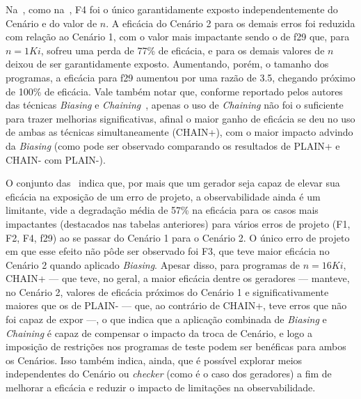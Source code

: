 Na~, como na~, F4 foi o único
garantidamente exposto independentemente do Cenário e do valor de $n$. A
eficácia do Cenário 2 para os demais erros foi reduzida com relação ao Cenário
1, com o valor mais impactante sendo o de f29 que, para $n = 1Ki$, sofreu uma
perda de 77\% de eficácia, e para os demais valores de $n$ deixou de ser
garantidamente exposto. Aumentando, porém, o tamanho dos programas, a eficácia
para f29 aumentou por uma razão de 3.5, chegando próximo de 100\% de eficácia.
Vale também notar que, conforme reportado pelos autores das técnicas
\textit{Biasing} e \textit{Chaining}~\cite{Andrade:2019}, apenas o uso de
\textit{Chaining} não foi o suficiente para trazer melhorias significativas,
afinal o maior ganho de eficácia se deu no uso de ambas as técnicas
simultaneamente (CHAIN+), com o maior impacto advindo da \textit{Biasing} (como
pode ser observado comparando os resultados de PLAIN+ e CHAIN- com PLAIN-).

O conjunto
das~
indica que, por mais que um gerador seja capaz de elevar sua eficácia na
exposição de um erro de projeto, a observabilidade ainda é um limitante, vide a
degradação média de 57\% na eficácia para os casos mais impactantes (destacados
nas tabelas anteriores) para vários erros de projeto (F1, F2, F4, f29) ao se
passar do Cenário 1 para o Cenário 2.  O único erro de projeto em que esse
efeito não pôde ser observado foi F3, que teve maior eficácia no Cenário 2
quando aplicado \textit{Biasing}.  Apesar disso, para programas de $n = 16Ki$,
CHAIN+ --- que teve, no geral, a maior eficácia dentre os geradores ---
manteve, no Cenário 2, valores de eficácia próximos do Cenário 1 e
significativamente maiores que os de PLAIN- --- que, ao contrário de CHAIN+,
teve erros que não foi capaz de expor ---, o que indica que a aplicação
combinada de \textit{Biasing} e \textit{Chaining} é capaz de compensar o
impacto da troca de Cenário, e logo a imposição de restrições nos programas de
teste podem ser benéficas para ambos os Cenários. Isso também indica, ainda,
que é possível explorar meios independentes do Cenário ou \textit{checker}
(como é o caso dos geradores) a fim de melhorar a eficácia e reduzir o impacto
de limitações na observabilidade.

%
